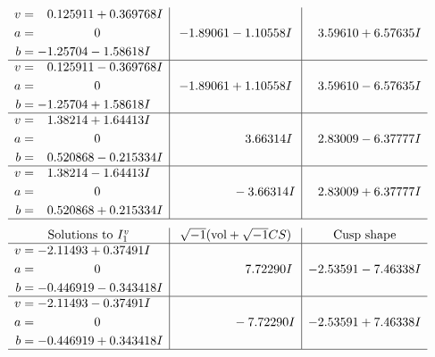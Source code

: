 \documentclass[1p]{elsarticle_modified}
\theoremstyle{definition}
\newcommand{\I}{\sqrt{-1}}
\begin{document}
$$\begin{array}{c|c|c}
\begin{aligned}
v &= \phantom{-}0.125911 + 0.369768 I \\
a &= \phantom{-0.000000 } 0 \\
b &= -1.25704 - 1.58618 I\end{aligned}
 & -1.89061 - 1.10558 I & \phantom{-}3.59610 + 6.57635 I \\ \hline\begin{aligned}
v &= \phantom{-}0.125911 - 0.369768 I \\
a &= \phantom{-0.000000 } 0 \\
b &= -1.25704 + 1.58618 I\end{aligned}
 & -1.89061 + 1.10558 I & \phantom{-}3.59610 - 6.57635 I \\ \hline\begin{aligned}
v &= \phantom{-}1.38214 + 1.64413 I \\
a &= \phantom{-0.000000 } 0 \\
b &= \phantom{-}0.520868 - 0.215334 I\end{aligned}
 & \phantom{-0.000000 -}3.66314 I & \phantom{-}2.83009 - 6.37777 I \\ \hline\begin{aligned}
v &= \phantom{-}1.38214 - 1.64413 I \\
a &= \phantom{-0.000000 } 0 \\
b &= \phantom{-}0.520868 + 0.215334 I\end{aligned}
 & \phantom{-0.000000 } -3.66314 I & \phantom{-}2.83009 + 6.37777 I\\
 \hline 
 \end{array}$$\newpage$$\begin{array}{c|c|c}  
\text{Solutions to }I^v_{1}& \I (\text{vol} + \sqrt{-1}CS) & \text{Cusp shape}\\
 \hline 
\begin{aligned}
v &= -2.11493 + 0.37491 I \\
a &= \phantom{-0.000000 } 0 \\
b &= -0.446919 - 0.343418 I\end{aligned}
 & \phantom{-0.000000 -}7.72290 I & -2.53591 - 7.46338 I \\ \hline\begin{aligned}
v &= -2.11493 - 0.37491 I \\
a &= \phantom{-0.000000 } 0 \\
b &= -0.446919 + 0.343418 I\end{aligned}
 & \phantom{-0.000000 } -7.72290 I & -2.53591 + 7.46338 I\\
 \hline 
 \end{array}$$\newpage
\end{document}
